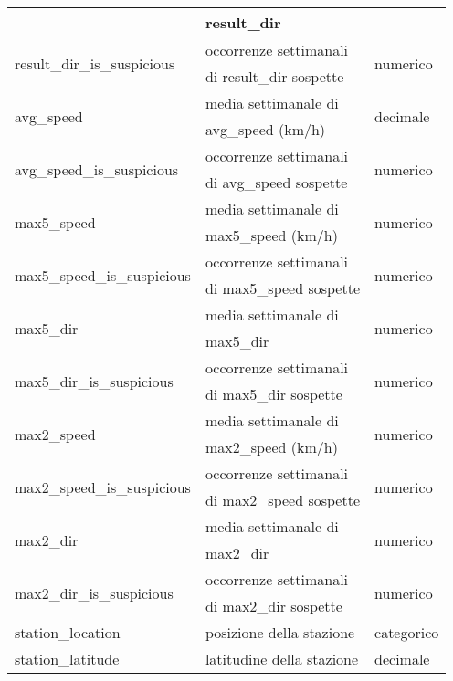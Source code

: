 \begin{longtable}{lll}
	& result\_dir &\\	\hline	
	\multirow{2}{*}{result\_dir\_is\_suspicious}		& occorrenze 
	settimanali & \multirow{2}{*}{numerico}	\\
	& di result\_dir sospette &	 \\	\hline		
	\multirow{2}{*}{avg\_speed}		& media settimanale di	 & 	
	\multirow{2}{*}{decimale}	\\ 
	& avg\_speed (km/h) &\\\hline	
	\multirow{2}{*}{avg\_speed\_is\_suspicious}		& occorrenze settimanali & 
	\multirow{2}{*}{numerico}	\\
	& di avg\_speed sospette &	 \\	\hline		
	\multirow{2}{*}{max5\_speed}	& media settimanale di  & 
	\multirow{2}{*}{numerico}	\\
	& max5\_speed (km/h) &\\\hline	
	\multirow{2}{*}{max5\_speed\_is\_suspicious}		& occorrenze 
	settimanali & \multirow{2}{*}{numerico}	\\
	& di max5\_speed sospette &  \\	\hline		
	\multirow{2}{*}{max5\_dir} & media settimanale di  & 	
	\multirow{2}{*}{numerico} \\
	&max5\_dir&\\ \hline
	\multirow{2}{*}{max5\_dir\_is\_suspicious}		& occorrenze settimanali & 
	\multirow{2}{*}{numerico}	\\
	& di max5\_dir sospette & \\ \hline	
	\multirow{2}{*}{max2\_speed}	& media settimanale di 	 & 	
	\multirow{2}{*}{numerico}	\\ 
	& max2\_speed (km/h) &\\	\hline		
	\multirow{2}{*}{max2\_speed\_is\_suspicious} & occorrenze settimanali & 
	\multirow{2}{*}{numerico}	\\
	& di max2\_speed sospette &  \\	\hline			
	\multirow{2}{*}{max2\_dir}	& media settimanale di  & 		
	\multirow{2}{*}{numerico} \\ 
	& max2\_dir & \\ \hline
	\multirow{2}{*}{max2\_dir\_is\_suspicious}		& occorrenze settimanali & 
	\multirow{2}{*}{numerico}	\\
	& di max2\_dir sospette &  \\ \hline
	station\_location & posizione della stazione & categorico \\	\hline
	\multirow{2}{*}{station\_latitude}	& \multirow{2}{*}{latitudine della 
		stazione}	&  decimale    \\ 

\end{longtable}
